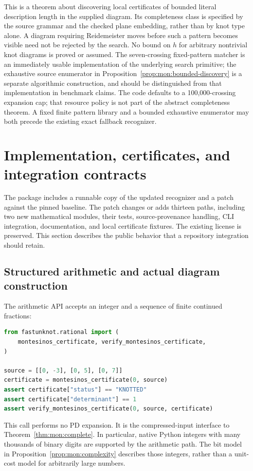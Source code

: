 \documentclass[11pt,a4paper]{article}
\theoremstyle{definition}
\theoremstyle{remark}
\newcommand{\code}[1]{\texttt{\detokenize{#1}}}
\numberwithin{equation}{section}
\begin{document}
This is a theorem about discovering local certificates of bounded literal
description length in the supplied diagram.  Its completeness class is
specified by the source grammar and the checked plane embedding, rather than
by knot type alone.  A diagram requiring Reidemeister moves before such a
pattern becomes visible need not be rejected by the search.  No bound on
$h$ for arbitrary nontrivial knot diagrams is proved or assumed.  The
seven-crossing fixed-pattern matcher is an immediately usable implementation
of the underlying search primitive; the exhaustive source enumerator in
Proposition~\ref{prop:mon:bounded-discovery} is a separate algorithmic
construction, and should be distinguished from that implementation in
benchmark claims. The code defaults to a 100,000-crossing expansion cap;
that resource policy is not part of the abstract completeness theorem.
A fixed finite pattern library and a bounded exhaustive
enumerator may both precede the existing exact fallback recognizer.

\section{Implementation, certificates, and integration contracts}
\label{sec:implementation}

The package includes a runnable copy of the updated \code{fast} recognizer
and a patch against the pinned baseline. The patch changes or adds thirteen
paths, including two new mathematical modules, their tests, source-provenance
handling, CLI integration, documentation, and local certificate fixtures.
The existing license is preserved. This section describes the public
behavior that a repository integration should retain.

\subsection{Structured arithmetic and actual diagram construction}

The arithmetic API accepts an integer and a sequence of finite continued
fractions:
\begin{lstlisting}[language=Python]
from fastunknot.rational import (
    montesinos_certificate, verify_montesinos_certificate,
)

source = [[0, -3], [0, 5], [0, 7]]
certificate = montesinos_certificate(0, source)
assert certificate["status"] == "KNOTTED"
assert certificate["determinant"] == 1
assert verify_montesinos_certificate(0, source, certificate)
\end{lstlisting}
This call performs no PD expansion. It is the compressed-input interface
to Theorem~\ref{thm:mon:complete}. In particular, native Python integers
with many thousands of binary digits are supported by the arithmetic path.
The bit model in Proposition~\ref{prop:mon:complexity} describes those
integers, rather than a unit-cost model for arbitrarily large numbers.
\end{document}
